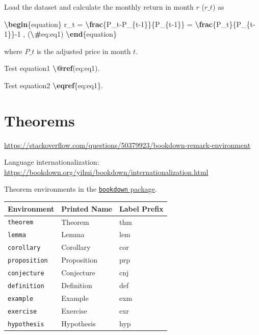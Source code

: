 \documentclass[
  a4paper,
  twoside,
  openright]{book}
\newenvironment{Shaded}{\begin{snugshade}}{\end{snugshade}}
\newcommand{\ExtensionTok}[1]{#1}
\newcommand{\FunctionTok}[1]{\textcolor[rgb]{0.13,0.29,0.53}{\textbf{#1}}}
\newcommand{\KeywordTok}[1]{\textcolor[rgb]{0.13,0.29,0.53}{\textbf{#1}}}
\newcommand{\NormalTok}[1]{#1}
\newcommand{\SpecialCharTok}[1]{\textcolor[rgb]{0.81,0.36,0.00}{\textbf{#1}}}
\newcommand{\SpecialStringTok}[1]{\textcolor[rgb]{0.31,0.60,0.02}{#1}}
\theoremstyle{definition}
\theoremstyle{definition}
\theoremstyle{definition}
\theoremstyle{definition}
\theoremstyle{remark}
\begin{document}
\begin{Shaded}
\begin{Highlighting}[]
\NormalTok{Load the dataset and calculate the monthly return in month }\SpecialStringTok{$r$}\NormalTok{ (}\SpecialStringTok{$r\_t$}\NormalTok{) as}

\KeywordTok{\textbackslash{}begin}\NormalTok{\{}\ExtensionTok{equation}\NormalTok{\}}
\SpecialStringTok{r\_t = }\SpecialCharTok{\textbackslash{}frac}\SpecialStringTok{\{P\_t{-}P\_\{t{-}1\}\}\{P\_\{t{-}1\}\} = }\SpecialCharTok{\textbackslash{}frac}\SpecialStringTok{\{P\_t\}\{P\_\{t{-}1\}\}{-}1 , }
\SpecialStringTok{(}\SpecialCharTok{\textbackslash{}\#}\SpecialStringTok{eq:eq1)}
\KeywordTok{\textbackslash{}end}\NormalTok{\{}\ExtensionTok{equation}\NormalTok{\}}

\NormalTok{where }\SpecialStringTok{$P\_t$}\NormalTok{ is the adjusted price in month }\SpecialStringTok{$t$}\NormalTok{. }

\NormalTok{Test equation1 }\FunctionTok{\textbackslash{}@ref}\NormalTok{(eq:eq1).}

\NormalTok{Test equation2 }\KeywordTok{\textbackslash{}eqref}\NormalTok{\{}\ExtensionTok{eq:eq1}\NormalTok{\}.}
\end{Highlighting}
\end{Shaded}

\section{Theorems}\label{theorems}

\url{https://stackoverflow.com/questions/50379923/bookdown-remark-environment}

Language internationalization: \url{https://bookdown.org/yihui/bookdown/internationalization.html}

Theorem environments in the \href{https://bookdown.org/yihui/bookdown/markdown-extensions-by-bookdown.html\#tab:theorem-envs}{\texttt{bookdown} package}.

\begin{longtable}[]{@{}lll@{}}
\toprule\noalign{}
Environment & Printed Name & Label Prefix \\
\midrule\noalign{}
\endhead
\bottomrule\noalign{}
\endlastfoot
\texttt{theorem} & Theorem & thm \\
\texttt{lemma} & Lemma & lem \\
\texttt{corollary} & Corollary & cor \\
\texttt{proposition} & Proposition & prp \\
\texttt{conjecture} & Conjecture & cnj \\
\texttt{definition} & Definition & def \\
\texttt{example} & Example & exm \\
\texttt{exercise} & Exercise & exr \\
\texttt{hypothesis} & Hypothesis & hyp \\
\end{longtable}
\end{document}
